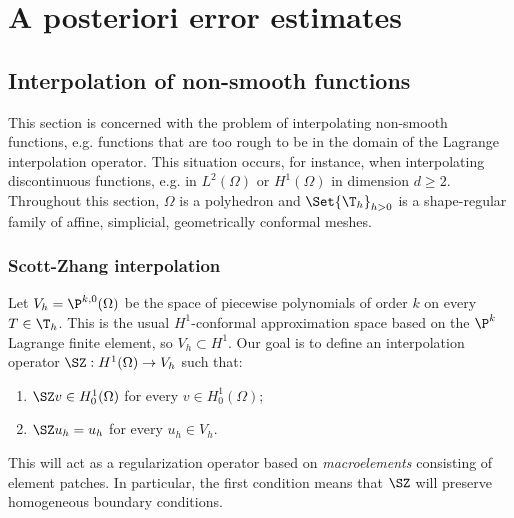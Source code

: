 
\chapter[A posteriori error estimates]{A posteriori error estimates}

\section{Interpolation of non-smooth functions}

This section is concerned with the problem of interpolating non-smooth functions, e.g. functions that are too rough to be in the domain of the Lagrange interpolation operator. This situation occurs, for instance, when interpolating discontinuous functions, e.g. in $L^2(\Omega)$ or $H^1(\Omega)$ in dimension $d \ge 2$.
Throughout this section, $\Omega$ is a polyhedron and $\Set{\T_h}_{h>0}$ is a shape-regular family of affine, simplicial, geometrically conformal meshes.


\subsection{Scott-Zhang interpolation}

Let $V_h = \P^{k,0}(\Omega)$ be the space of piecewise polynomials of order $k$ on every $T \in \T_h$. This is the usual $H^1$-conformal approximation space based on the $\P^k$ Lagrange finite element, so $V_h \subset H^1$.
Our goal is to define an interpolation operator $\SZ: H^1(\Omega) \to V_h$ such that:
\begin{enumerate}
    \item $\SZ v \in H^1_0(\Omega)$ for every $v \in H^1_0(\Omega)$;
    \item $\SZ u_h = u_h$ for every $u_h \in V_h$.
\end{enumerate}
This will act as a regularization operator based on \emph{macroelements} consisting of element patches. In particular, the first condition means that $\SZ$ will preserve homogeneous boundary conditions.

